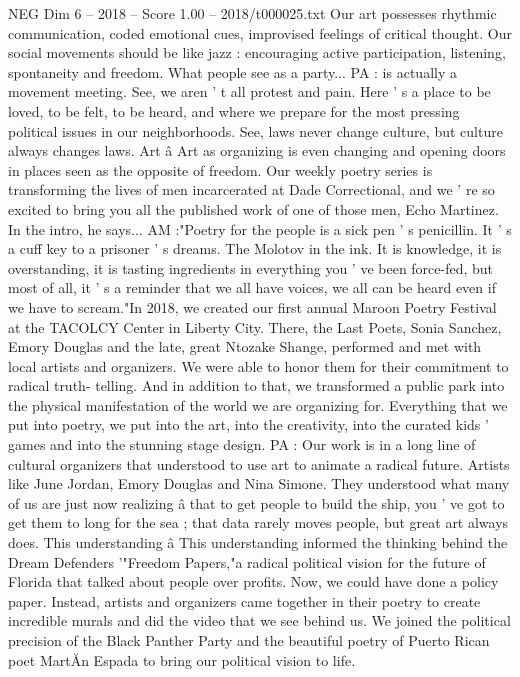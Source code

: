 \begin{textsample}{NEG Dim 6 – 2018 – Score 1.00 – 2018/t000025.txt}
Our art possesses rhythmic communication, coded emotional cues, improvised feelings of critical thought.
Our social movements should be like jazz : encouraging active participation, listening, spontaneity and freedom.
What people see as a party...
PA : is actually a movement meeting.
See, we aren ' t all protest and pain.
Here ' s a place to be loved, to be felt, to be heard, and where we prepare for the most pressing political issues in our neighborhoods.
See, laws never change culture, but culture always changes laws.
Art â Art as organizing is even changing and opening doors in places seen as the opposite of freedom.
Our weekly poetry series is transforming the lives of men incarcerated at Dade Correctional, and we ' re so excited to bring you all the published work of one of those men, Echo Martinez.
In the intro, he says...
AM :"Poetry for the people is a sick pen ' s penicillin.
It ' s a cuff key to a prisoner ' s dreams.
The Molotov in the ink.
It is knowledge, it is overstanding, it is tasting ingredients in everything you ' ve been force-fed, but most of all, it ' s a reminder that we all have voices, we all can be heard even if we have to scream."In 2018, we created our first annual Maroon Poetry Festival at the TACOLCY Center in Liberty City.
There, the Last Poets, Sonia Sanchez, Emory Douglas and the late, great Ntozake Shange, performed and met with local artists and organizers.
We were able to honor them for their commitment to radical truth- telling.
And in addition to that, we transformed a public park into the physical manifestation of the world we are organizing for.
Everything that we put into poetry, we put into the art, into the creativity, into the curated kids ' games and into the stunning stage design.
PA : Our work is in a long line of cultural organizers that understood to use art to animate a radical future.
Artists like June Jordan, Emory Douglas and Nina Simone.
They understood what many of us are just now realizing â that to get people to build the ship, you ' ve got to get them to long for the sea ; that data rarely moves people, but great art always does.
This understanding â This understanding informed the thinking behind the Dream Defenders '"Freedom Papers,"a radical political vision for the future of Florida that talked about people over profits.
Now, we could have done a policy paper.
Instead, artists and organizers came together in their poetry to create incredible murals and did the video that we see behind us.
We joined the political precision of the Black Panther Party and the beautiful poetry of Puerto Rican poet MartĂ­n Espada to bring our political vision to life.

\end{textsample}
